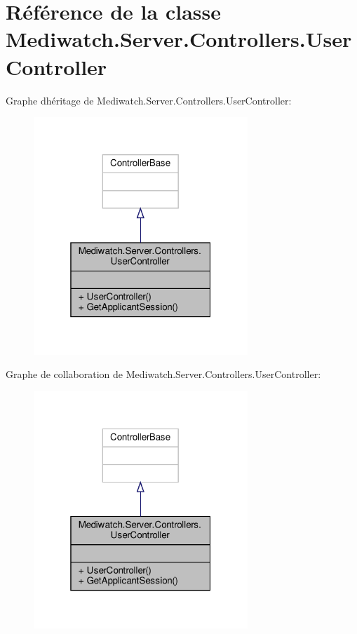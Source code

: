 \hypertarget{class_mediwatch_1_1_server_1_1_controllers_1_1_user_controller}{}\section{Référence de la classe Mediwatch.\+Server.\+Controllers.\+User\+Controller}
\label{class_mediwatch_1_1_server_1_1_controllers_1_1_user_controller}


Graphe d\textquotesingle{}héritage de Mediwatch.\+Server.\+Controllers.\+User\+Controller\+:
\nopagebreak
\begin{figure}[H]
\begin{center}
\leavevmode
\includegraphics[width=229pt]{class_mediwatch_1_1_server_1_1_controllers_1_1_user_controller__inherit__graph}
\end{center}
\end{figure}


Graphe de collaboration de Mediwatch.\+Server.\+Controllers.\+User\+Controller\+:
\nopagebreak
\begin{figure}[H]
\begin{center}
\leavevmode
\includegraphics[width=229pt]{class_mediwatch_1_1_server_1_1_controllers_1_1_user_controller__coll__graph}
\end{center}
\end{figure}
